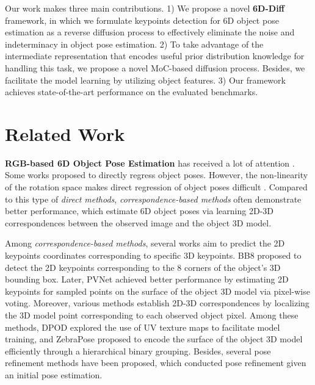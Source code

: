 \documentclass[10pt,twocolumn,letterpaper]{article}
\begin{document}
Our work makes three main contributions.
1) We propose a novel \textbf{6D-Diff} framework, in which we formulate keypoints detection for 6D object pose estimation as a reverse diffusion process to effectively eliminate the noise and indeterminacy in object pose estimation.
2) To take advantage of the intermediate representation that encodes useful prior distribution knowledge for handling this task, we propose a novel MoC-based diffusion process. Besides, we facilitate the model learning by utilizing object features.
3) Our framework achieves state-of-the-art performance on the evaluated benchmarks.


\section{Related Work}
\noindent\textbf{RGB-based 6D Object Pose Estimation} has received a lot of attention \cite{xiang2018posecnn,park2019pix2pose,peng2019pvnet,rad2017bb8,tekin2018real,su2022zebrapose,castro2023crt,Iwase_2021_ICCV,li2018deepim,Manhardt_2018_ECCV,Sundermeyer2018Implicit3O,Zakharov2019DPOD6P,xu2022rnnpose,haugaard2022surfemb,li2022dcl,liu2022gdrnpp_bop,yang2023object,guo2023knowledge,hai2023rigidity,hai2023shape}. 
Some works \cite{xiang2018posecnn,kehl2017ssd, hu2020single, wang2021gdr} proposed to directly regress object poses. 
However, the non-linearity of the rotation space makes direct regression of object poses difficult \cite{li2022dcl}. 
Compared to this type of \textit{direct methods}, \textit{correspondence-based methods} \cite{chen2020end,hodan2020epos,park2019pix2pose,peng2019pvnet,rad2017bb8,tekin2018real,su2022zebrapose} often demonstrate better performance, which estimate 6D object poses via learning 2D-3D correspondences between the observed image and the object 3D model.

Among \textit{correspondence-based methods}, several works \cite{rad2017bb8,peng2019pvnet,tekin2018real,oberweger2018making,ren2022robust} aim to predict the 2D keypoints coordinates corresponding to specific 3D keypoints. 
BB8 \cite{rad2017bb8} proposed to detect the 2D keypoints corresponding to the 8 corners of the object’s 3D bounding box. 
Later, PVNet \cite{peng2019pvnet} achieved better performance by estimating 2D keypoints for sampled points on the surface of the object 3D model via pixel-wise voting.
Moreover, various methods \cite{park2019pix2pose,Zakharov2019DPOD6P,hodan2020epos,wang2021gdr,su2022zebrapose} establish 2D-3D correspondences by localizing the 3D model point corresponding to each observed object pixel.
Among these methods, DPOD \cite{Zakharov2019DPOD6P} explored the use of UV texture maps to facilitate model training,
and ZebraPose \cite{su2022zebrapose} proposed to encode the surface of the object 3D model efficiently through a hierarchical binary grouping.
Besides, several pose refinement methods  \cite{Iwase_2021_ICCV,li2018deepim,Manhardt_2018_ECCV,xu2022rnnpose} have been proposed, which conducted pose refinement given an initial pose estimation.
\end{document}
